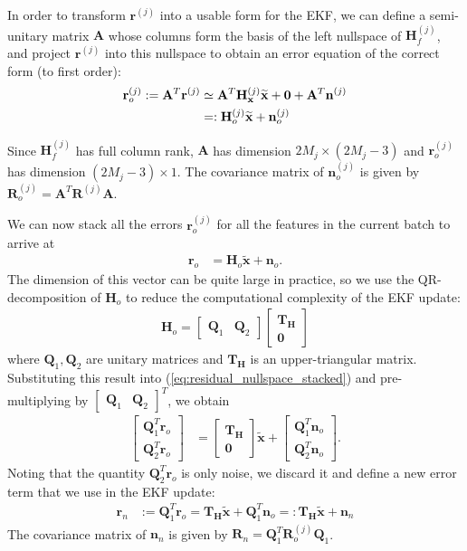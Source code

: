 \documentclass[letterpaper, 10 pt, conference]{ieeeconf}  %
\def\Vec#1{\mathbf{#1}}
\newcommand{\bbm}{\begin{bmatrix}}
\newcommand{\ebm}{\end{bmatrix}}
\begin{document}
In order to transform $\Vec{r}^{(j)}$ into a usable form for the EKF, we can define a semi-unitary matrix $\Vec{A}$ whose columns form the basis of the left nullspace of $\Vec{H}_{f}^{(j)}$, and project $\Vec{r}^{(j)}$ into this nullspace to obtain an error equation of the correct form (to first order):
\begin{align}
    \Vec{r}_o^{(j)} := \Vec{A}^T \Vec{r}^{(j)} 
                    &\simeq \Vec{A}^T \Vec{H}_{\Vec{x}}^{(j)} \widetilde{\Vec{x}} + \Vec{0} + \Vec{A}^T \Vec{n}^{(j)} \notag \\
                    &=: \Vec{H}_{o}^{(j)} \widetilde{\Vec{x}} + \Vec{n}_o^{(j)}
\end{align}

Since $\Vec{H}_{f}^{(j)}$ has full column rank, $\Vec{A}$ has dimension $2M_j \times \left(2M_j - 3\right)$ and $\Vec{r}_o^{(j)}$ has dimension $\left(2M_j - 3\right) \times 1$.
The covariance matrix of $\Vec{n}_o^{(j)}$ is given by $\Vec{R}_o^{(j)} = \Vec{A}^T\Vec{R}^{(j)}\Vec{A}$.

We can now stack all the errors $\Vec{r}_o^{(j)}$ for all the features in the current batch to arrive at
\begin{align} \label{eq:residual_nullspace_stacked}
    \Vec{r}_o &= \Vec{H}_o \widetilde{\Vec{x}} + \Vec{n}_o .
\end{align}
The dimension of this vector can be quite large in practice, so we use the QR-decomposition of $\Vec{H}_o$ to reduce the computational complexity of the EKF update:
\begin{align}
    \Vec{H}_o = \bbm \Vec{Q}_1 & \Vec{Q}_2 \ebm \bbm \Vec{T}_\Vec{H} \\ \Vec{0} \ebm
\end{align}
where $\Vec{Q}_1, \Vec{Q}_2$ are unitary matrices and $\Vec{T}_\Vec{H}$ is an upper-triangular matrix.
Substituting this result into (\ref{eq:residual_nullspace_stacked}) and pre-multiplying by $\bbm \Vec{Q}_1 & \Vec{Q}_2 \ebm ^T$, we obtain
\begin{align}
    \bbm \Vec{Q}_1^T \Vec{r}_o \\ \Vec{Q}_2^T \Vec{r}_o \ebm &= \bbm \Vec{T}_\Vec{H} \\ \Vec{0} \ebm \widetilde{\Vec{x}} + \bbm \Vec{Q}_1^T \Vec{n}_o \\ \Vec{Q}_2^T \Vec{n}_o \ebm .
\end{align}
Noting that the quantity $\Vec{Q}_2^T \Vec{r}_o$ is only noise, we discard it and define a new error term that we use in the EKF update:
\begin{align}
    \Vec{r}_n &:= \Vec{Q}_1^T \Vec{r}_o = \Vec{T}_\Vec{H} \widetilde{\Vec{x}} + \Vec{Q}_1^T \Vec{n}_o =: \Vec{T}_\Vec{H} \widetilde{\Vec{x}} + \Vec{n}_n
\end{align} 
The covariance matrix of $\Vec{n}_n$ is given by $\Vec{R}_n = \Vec{Q}_1^T \Vec{R}_o^{(j)} \Vec{Q}_1$.
\end{document}
